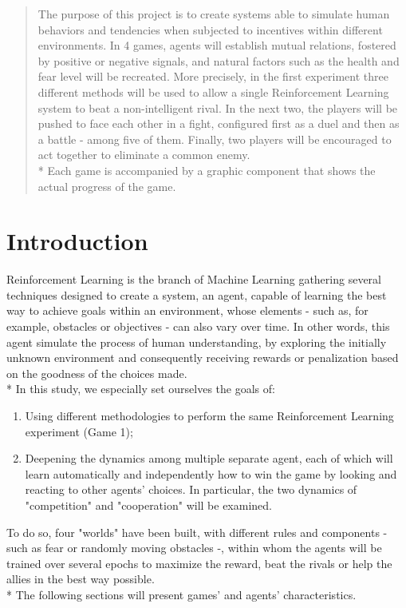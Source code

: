 \begin{abstract}
The purpose of this project is to create systems able to simulate human behaviors and tendencies when subjected to incentives within different environments. In 4 games, agents will establish mutual relations, fostered by positive or negative signals, and natural factors such as the health and fear level will be recreated. More precisely, in the first experiment three different methods will be used to allow a single Reinforcement Learning system to beat a non-intelligent rival. In the next two,
the players will be pushed to face each other in a fight, configured first as a duel and then as a battle - among five of them. Finally, two players will be encouraged to act together to eliminate a common enemy.\\*
Each game is accompanied by a graphic component that shows the actual progress of the game.
\end{abstract}
\newpage
\newpage
\tableofcontents
\newpage
\section{Introduction}
Reinforcement Learning is the branch of Machine Learning gathering several techniques designed to create a system, an agent, capable of learning the best way to achieve goals within an environment, whose elements - such as, for example, obstacles or objectives - can also vary over time. In other words, this agent simulate the process of human understanding, by exploring the initially unknown environment and consequently receiving rewards or penalization based on the goodness of the choices made.\\*
In this study, we especially set ourselves the goals of:
\begin{enumerate}
  \item Using different methodologies to perform the same Reinforcement Learning experiment (Game 1);
  \item Deepening the dynamics among multiple separate agent, each of which will learn automatically and independently how to win the game by looking and reacting to other agents' choices. In particular, the two dynamics of "competition" and "cooperation" will be examined.
\end{enumerate}
To do so, four "worlds" have been built, with different rules and components - such as fear or randomly moving obstacles -, within whom the agents will be trained over several epochs to maximize the reward, beat the rivals or help the allies in the best way possible.\\*
The following sections will present games' and agents' characteristics. 
\newpage

